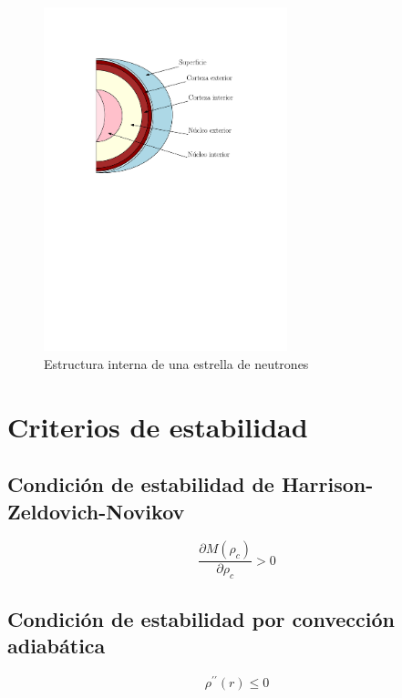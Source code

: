 \begin{figure}[H]
    \centering
    \includegraphics[width=200pt]{figures/neutronstar.pdf}
    \caption{Estructura interna de una estrella de neutrones}
    \label{NSS}
\end{figure}

\section{Criterios de estabilidad}

\subsection{Condición de estabilidad de Harrison-Zeldovich-Novikov}

\begin{equation}
    \frac { \partial M \left( \rho _ { c } \right) } { \partial \rho _ { c } } > 0
\end{equation}


\subsection{Condición de estabilidad por convección adiabática}

\begin{equation}
    \rho ^ { \prime \prime } ( r ) \leq 0
\end{equation}
